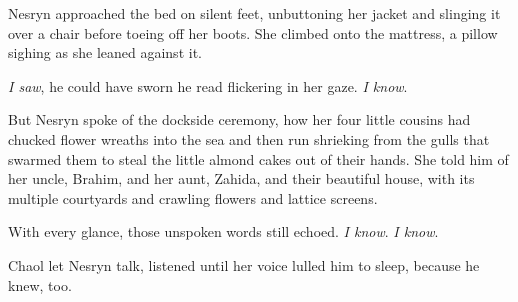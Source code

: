 Nesryn approached the bed on silent feet, unbuttoning her jacket and slinging it over a chair before toeing off her boots. She climbed onto the mattress, a pillow sighing as she leaned against it.

\emph{I saw}, he could have sworn he read flickering in her gaze. \emph{I know}.

But Nesryn spoke of the dockside ceremony, how her four little cousins had chucked flower wreaths into the sea and then run shrieking from the gulls that swarmed them to steal the little almond cakes out of their hands. She told him of her uncle, Brahim, and her aunt, Zahida, and their beautiful house, with its multiple courtyards and crawling flowers and lattice screens.

With every glance, those unspoken words still echoed. \emph{I know}. \emph{I know}.

Chaol let Nesryn talk, listened until her voice lulled him to sleep, because he knew, too.

